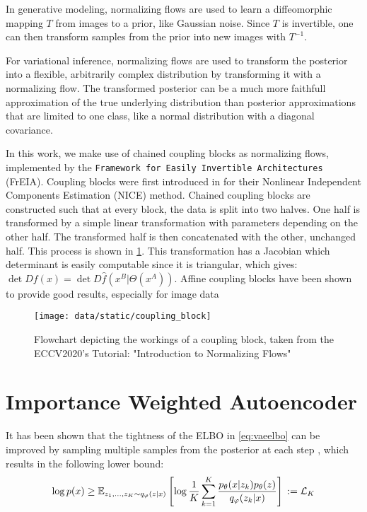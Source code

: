 In generative modeling, normalizing flows are used to learn a diffeomorphic mapping $T$ from images to a prior, like Gaussian noise.
Since $T$ is invertible, one can then transform samples from the prior into new images with $T^{-1}$.

For variational inference, normalizing flows are used to transform the posterior into a flexible, arbitrarily complex distribution by transforming it with a normalizing flow.
The transformed posterior can be a much more faithfull approximation of the true underlying distribution than posterior approximations that are limited to one class, like a normal distribution with a diagonal covariance.

\smallskip

In this work, we make use of chained coupling blocks as normalizing flows, implemented by the \textcolor{dg}{\texttt{Framework for Easily Invertible Architectures}} (FrEIA).
Coupling blocks were first introduced in \citep{dinh_nice_2015} for their Nonlinear Independent Components Estimation (NICE) method.
Chained coupling blocks are constructed such that at every block, the data is split into two halves.
One half is transformed by a simple linear transformation with parameters depending on the other half.
The transformed half is then concatenated with the other, unchanged half.
This process is shown in \cref{fig:coupling block}.
This transformation has a Jacobian which determinant is easily computable since it is triangular, which gives: $\det Df(x) = \det D\hat{f}(x^B | \Theta (x^A))$.
Affine coupling blocks have been shown to provide good results, especially for image data \citep{dinh_density_2017}

\begin{figure}
    \centering
    \texttt{[image: data/static/coupling\_block]}
    \caption{Flowchart depicting the workings of a coupling block, taken from the ECCV2020's Tutorial: "Introduction to Normalizing Flows" \citep{coupling_blocks}}
    \label{fig:coupling block}
\end{figure}



\section{Importance Weighted Autoencoder} \label{subsec:iwvae}
It has been shown that the tightness of the ELBO in \cref{eq:vaeelbo} can be improved by sampling multiple samples from the posterior at each step \parencite{burda_importance_2016}, which results in the following lower bound:
\begin{equation}
    \label{eq:iwelbo}
    \log p(x) \geq \mathbb{E}_{z_1,\ldots,z_K \sim q_{\phi}(z|x)}\left[ \log \frac{1}{K} \sum ^K _{k=1} \frac{p_{\theta}(x|z_k)p_{\theta}(z)}{q_{\phi}(z_k| x)} \right]\\
    := \mathcal{L}_K
\end{equation}

